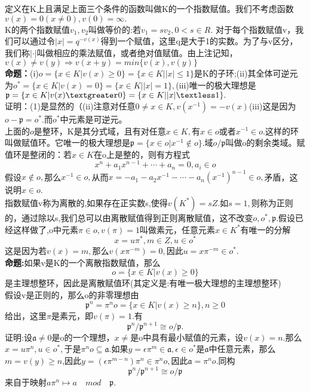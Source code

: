 \documentclass[UTF8]{article}
\begin{document}
     定义在K上且满足上面三个条件的函数叫做K的一个指数赋值。我们不考虑函数$v(x)=0(x\neq 0),v(0)=\infty .$\\
     K的两个指数赋值$v_{1},v_{2}$叫做等价的:若$v_{1}=sv_{2},0<s\in R$.
     对于每个指数赋值v，我们可以通过令$|x|=q^{-v(x)}$得到一个赋值，这里q是大于1的实数。为了与v区分，我们称$|\cdot|$叫做相应的乘法赋值，或者绝对值赋值。由上注记知，$v(x)\neq v(y)\Longrightarrow v(x+y)=min \{v(x),v(y)\}$\\
     \textbf{命题：}(i)$o=\{x\in K|v(x)\geq 0\}=\{x\in K||x|\leq 1\}$是K的子环;(ii)其全体可逆元为$o^{*}=\{x\in K|v(x)=0\}=\{x\in K||x|=1\},$(iii)唯一的极大理想是$\mathfrak{p}=\{x\in K|v(x)\textgreater0\}=\{x\in K||x|\textless 1\}.$\\
     证明：(1)是显然的（(ii)注意对任意$0\neq x\in K,v(x^{-1})=-v(x)$(iii)这是因为$o-\mathfrak{p}=o^{*}.$而$o^{*}$中元素是可逆元。\\
     上面的$o$是整环，K是其分式域，且有对任意$x\in K,$有$x\in o$或者$x^{-1}\in o.$这样的环叫做赋值环。它唯一的极大理想是$\mathfrak{p}=\{x\in o|x^{-1}\notin o\}.$域$o/\mathfrak{p}$叫做o的剩余类域。赋值环是整闭的：若$x\in K$在o上是整的，则有方程式$$
     x^{n}+a_{1}x^{n-1}+\cdots+a_{n}=0,a_{i}\in o
     $$
     假设$x\notin o,$那么$x^{-1}\in o,$从而$x=-a_{1}-a_{2}x^{-1}-\cdots-a_{n}(x^{-1})^{n-1}\in o,$矛盾，这说明$x\in o.$\\
      指数赋值v称为离散的,如果存在正实数s,使得$v(K^{*})=sZ.$如$s=1,$则称为正则的，通过除以s,我们总可以由离散赋值得到正则离散赋值，这不改变$o,o^{*},\mathfrak{p}.$假设已经这样做了,o中元素$\pi \in o,v(\pi)=1$叫做素元，任意元素$x\in K^{*}$有唯一的分解$$
      x=u\pi^{*},m \in Z,u\in o^{*}
            $$
     这是因为若$v(x)=m,$那么$v(x\pi^{-m})=0,$因此$u=x\pi^{-m}\in o^{*}.$\\
     \textbf{命题:}如果v是K的一个离散指数赋值，那么$$
     o=\{x\in K|v(x)\geq 0\}
     $$
     是主理想整环，因此是离散赋值环(其定义是:有唯一极大理想的主理想整环)\\
     假设v是正则的，那么o的非零理想由$$
     \mathfrak{p}^{n}=\pi^{n}o=\{x\in K|v(x)\geq n\},n\geq 0
     $$
     给出，这里$\pi$是素元，即$v(\pi)=1$.有$$
     \mathfrak{p}^{n}/\mathfrak{p}^{n+1}\cong o/\mathfrak{p}.
     $$
     证明:设$\mathfrak{a}\neq 0$是o的一个理想，$x\neq $是o中具有最小赋值的元素，设$v(x)=n.$那么$x=u\pi^{n},u\in o^{*},$于是$\pi^{n}o\subseteq \mathfrak{a}.$如果$y=\epsilon \pi^{m}\in \mathfrak{a},\epsilon\in o^{*}$是$\mathfrak{a}$中任意元素，那么$m=v(y)\geq n$,因此$y=(\epsilon \pi^{m-n})\pi^{n}\in \pi^{n}o,$因此$\mathfrak{a}=\pi^{n}o.$同构$$
     \mathfrak{p}^{n}/\mathfrak{p}^{n+1}\cong o/\mathfrak{p}
     $$来自于映射$a\pi^{n}\mapsto a\quad mod \quad \mathfrak{p}.$\\
\end{document}

